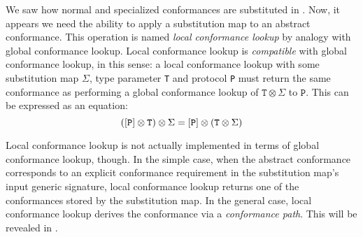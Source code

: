 \documentclass[../generics]{subfiles}
\begin{document}
We saw how normal and specialized conformances are substituted in . Now, it appears we need the ability to apply a substitution map to an abstract conformance. This operation is named \emph{local conformance lookup} by analogy with global conformance lookup. Local conformance lookup is \emph{compatible} with global conformance lookup, in this sense: a local conformance lookup with some substitution map $\Sigma$, type parameter \texttt{T} and protocol \texttt{P} must return the same conformance as performing a global conformance lookup of $\texttt{T}\otimes\Sigma$ to $\texttt{P}$. This can be expressed as an equation:
\[([\texttt{P}]\otimes\texttt{T})\otimes\Sigma=[\texttt{P}]\otimes(\texttt{T}\otimes\Sigma)\]

Local conformance lookup is not actually implemented in terms of global conformance lookup, though. In the simple case, when the abstract conformance corresponds to an explicit conformance requirement in the substitution map's input generic signature,  local conformance lookup returns one of the conformances stored by the substitution map. In the general case, local conformance lookup derives the conformance via a \emph{conformance path}. This will be revealed in .
\end{document}
